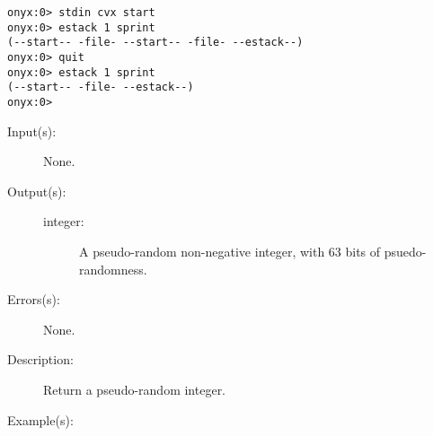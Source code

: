 \begin{description}
\begin{description}
\begin{verbatim}
onyx:0> stdin cvx start
onyx:0> estack 1 sprint
(--start-- -file- --start-- -file- --estack--)
onyx:0> quit
onyx:0> estack 1 sprint
(--start-- -file- --estack--)
onyx:0>
		\end{verbatim}
	\end{description}
\label{systemdict:rand}
\item[{\onyxop{--}{rand}{integer}}: ]
	\begin{description}\item[]
	\item[Input(s): ] None.
	\item[Output(s): ]
		\begin{description}\item[]
		\item[integer: ]
			A pseudo-random non-negative integer, with 63 bits of
			psuedo-randomness.
		\end{description}
	\item[Errors(s): ] None.
	\item[Description: ]
		Return a pseudo-random integer.
	\item[Example(s): ]\begin{verbatim}


\end{verbatim}
\end{description}
\end{description}
